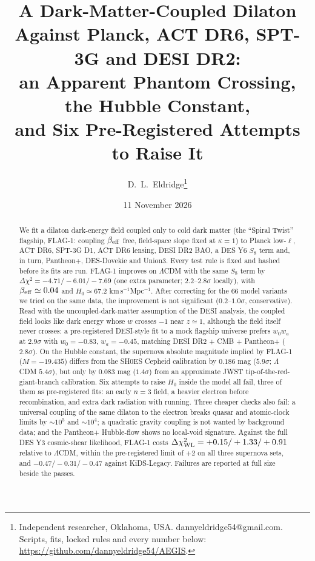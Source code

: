 \documentclass[11pt]{article}
\title{\textbf{A Dark-Matter-Coupled Dilaton Against Planck, ACT DR6, SPT-3G and DESI DR2:\\
an Apparent Phantom Crossing, the Hubble Constant,\\ and Six Pre-Registered Attempts to Raise It}}
\author{D.~L.~Eldridge\thanks{Independent researcher, Oklahoma, USA. dannyeldridge54@gmail.com.
Scripts, fits, locked rules and every number below: \url{https://github.com/dannyeldridge54/AEGIS}.}}
\date{11 November 2026}
\begin{document}
\sloppy
\maketitle

\begin{abstract}
We fit a dilaton dark-energy field coupled only to cold dark matter (the ``Spiral Twist'' flagship, FLAG-1: coupling
$\beta_{\rm eff}$ free, field-space slope fixed at $\kappa=1$) to Planck low-$\ell$, ACT DR6, SPT-3G D1, ACT DR6 lensing,
DESI DR2 BAO, a DES Y6 $S_8$ term and, in turn, Pantheon+, DES-Dovekie and Union3. Every test rule is fixed and hashed
before its fits are run. FLAG-1 improves on $\Lambda$CDM with the same $S_8$ term by $\Delta\chi^2=-4.71/-6.01/-7.69$
(one extra parameter; $2.2$--$2.8\sigma$ locally), with $\beta_{\rm eff}\simeq0.04$ and $H_0\simeq67.2$
km\,s$^{-1}$Mpc$^{-1}$. After correcting for the 66 model variants we tried on the same data, the improvement is not
significant ($0.2$--$1.0\sigma$, conservative). Read with the
uncoupled-dark-matter assumption of the DESI analysis, the coupled field looks like dark energy whose $w$ crosses $-1$
near $z\simeq1$, although the field itself never crosses: a pre-registered DESI-style fit to a mock flagship universe
prefers $w_0w_a$ at $2.9\sigma$ with $w_0=-0.83$, $w_a=-0.45$, matching DESI DR2 + CMB + Pantheon+ ($2.8\sigma$). On the Hubble
constant, the supernova absolute magnitude implied by FLAG-1 ($M=-19.435$) differs from the SH0ES Cepheid calibration by
$0.186$ mag ($5.9\sigma$; $\Lambda$CDM $5.4\sigma$), but only by $0.083$ mag ($1.4\sigma$) from an approximate JWST
tip-of-the-red-giant-branch calibration. Six attempts to raise $H_0$ inside the model all fail, three of them as
pre-registered fits: an early $n=3$ field, a heavier electron before recombination, and extra dark radiation with
running. Three cheaper checks also fail: a universal coupling of the same dilaton to the electron breaks quasar and
atomic-clock limits by $\sim10^{5}$ and $\sim10^{4}$; a quadratic gravity coupling is not wanted by background data;
and the Pantheon+ Hubble-flow shows no local-void signature. Against the full DES Y3 cosmic-shear likelihood, FLAG-1
costs $\Delta\chi^2_{\rm WL}=+0.15/+1.33/+0.91$ relative to $\Lambda$CDM, within the pre-registered limit of $+2$ on all
three supernova sets, and $-0.47/-0.31/-0.47$ against KiDS-Legacy. Failures are reported
at full size beside the passes.
\end{abstract}
\end{document}
